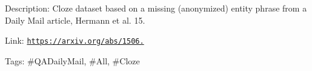 Description\+: Cloze dataset based on a missing (anonymized) entity phrase from a Daily Mail article, Hermann et al. \textquotesingle{}15.

Link\+: \href{https://arxiv.org/abs/1506.03340}{\tt https\+://arxiv.\+org/abs/1506.}

Tags\+: \#\+Q\+A\+Daily\+Mail, \#\+All, \#\+Cloze 
